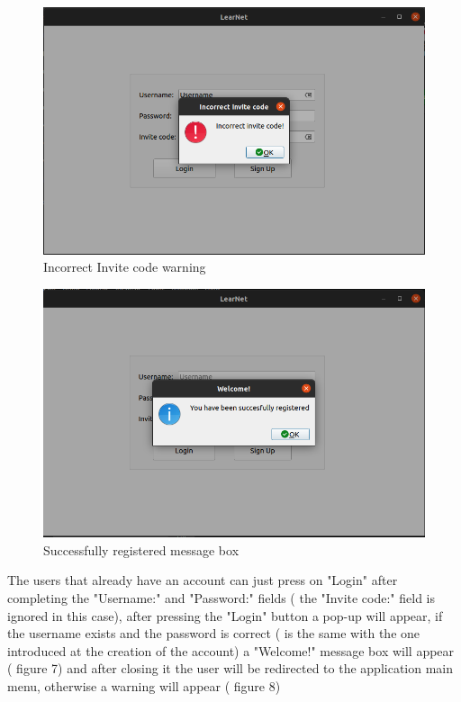 \documentclass[runningheads]{llncs}
\begin{document}
\begin{figure}[H]
\includegraphics[width=\textwidth,height=\textheight,keepaspectratio]{images/incorrectInvitecode.png}
\caption{Incorrect Invite code warning}
\end{figure}

\begin{figure}[H]
\includegraphics[width=\textwidth,height=\textheight,keepaspectratio]{images/succesfullyRegistered.png}
\caption{Successfully registered message box}
\end{figure}

The users that already have an account can just press on "Login" after completing the "Username:" and "Password:" fields ( the "Invite code:" field is ignored in this case), after pressing the "Login" button a pop-up will appear, if the username exists and the password is correct ( is the same with the one introduced at the creation of the account) a "Welcome!" message box will appear ( figure 7) and after closing it the user will be redirected to the application main menu, otherwise a warning will appear ( figure 8)
\newpage
\end{document}

